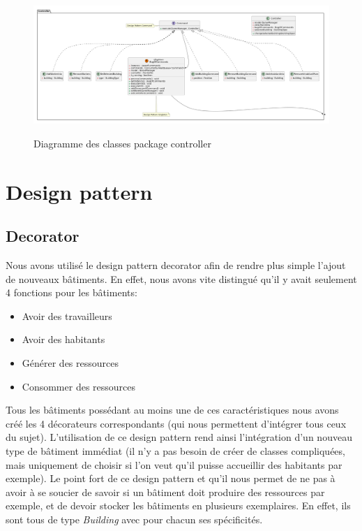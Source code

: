 \documentclass{article}
\begin{document}
\begin{figure}[h]
    \caption{Diagramme des classes package controller}
    \centering
    \includegraphics[width=\textwidth,height=\textheight,keepaspectratio]{controller_UML}
    \label{fig:UML_complet}
\end{figure}

\section{Design pattern}
\subsection{Decorator}
Nous avons utilisé le design pattern decorator afin de rendre plus simple l'ajout de nouveaux bâtiments.
En effet, nous avons vite distingué qu'il y avait seulement 4 fonctions pour les bâtiments:
\begin{itemize}
    \item Avoir des travailleurs
    \item Avoir des habitants
    \item Générer des ressources
    \item Consommer des ressources
\end{itemize}
Tous les bâtiments possédant au moins une de ces caractéristiques nous avons créé les 4 décorateurs correspondants
(qui nous permettent d'intégrer tous ceux du sujet). L'utilisation de ce design pattern rend ainsi l'intégration
d'un nouveau type de bâtiment immédiat (il n'y a pas besoin de créer de classes compliquées, mais uniquement de choisir
si l'on veut qu'il puisse accueillir des habitants par exemple). Le point fort de ce design pattern et qu'il nous permet
de ne pas à avoir à se soucier de savoir si un bâtiment doit produire des ressources par exemple, et de devoir stocker les
bâtiments en plusieurs exemplaires. En effet, ils sont tous de type \textit{Building} avec pour chacun ses spécificités.
\end{document}

